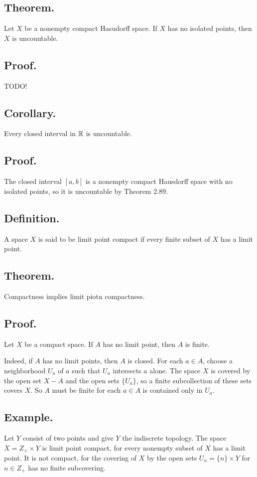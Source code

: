 \documentclass[titlepage]{article}
\begin{document}
\subsection{Theorem.} Let $X$ be a nonempty compact Hasudorff space. If $X$ has no isolated points, then $X$ is uncountable.

\subsection{Proof.} TODO!

\subsection{Corollary.} Every closed interval in $\mathbb{R}$ is uncountable.

\subsection{Proof.} The closed interval $[a, b]$ is a nonempty compact Hausdorff space with no isolated points, so it is uncountable by Theorem 2.89.

\subsection{Definition.} A space $X$ is said to be limit point compact if every finite subset of $X$ has a limit point.

\subsection{Theorem.} Compactness implies limit piotn compactness.

\subsection{Proof.} Let $X$ be a compact space. If $A$ has no limit point, then $A$ is finite.

Indeed, if $A$ has no limit points, then $A$ is closed. For each $a \in A$, choose a neighborhood $U_{a}$ of $a$ such that $U_{a}$ intersects $a$ alone. The space $X$ is covered by the open set $X - A$ and the open sets $\{U_{a}\}$, so a finite subcollection of these sets covers $X$. So $A$ must be finite for each $a \in A$ is contained only in $U_{a}$.

\subsection{Example.} Let $Y$ consist of two points and give $Y$ the indiscrete topology. The space $X = Z_{+} \times Y$ is limit point compact, for every nonempty subset of $X$ has a limit point. It is not compact, for the covering of $X$ by the open sets $U_{n} = \{n\} \times Y$ for $n \in Z_{+}$ has no finite subcovering.
\end{document}
